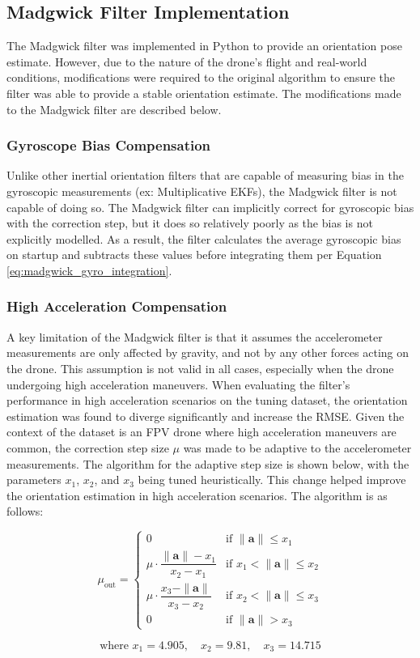 \documentclass[bare_jrnl_transmag]{subfiles}
\begin{document}
\subsection{Madgwick Filter Implementation}
The Madgwick filter was implemented in Python to provide an orientation pose estimate. However, due to the nature of the drone's flight and real-world conditions, modifications were required to the original algorithm to ensure the filter was able to provide a stable orientation estimate. The modifications made to the Madgwick filter are described below. \newline

\subsubsection{Gyroscope Bias Compensation}
Unlike other inertial orientation filters that are capable of measuring bias in the gyroscopic measurements (ex: Multiplicative EKFs), the Madgwick filter is not capable of doing so. The Madgwick filter can implicitly correct for gyroscopic bias with the correction step, but it does so relatively poorly as the bias is not explicitly modelled. As a result, the filter calculates the average gyroscopic bias on startup and subtracts these values before integrating them per Equation \ref{eq:madgwick_gyro_integration}. \newline

\subsubsection{High Acceleration Compensation}
A key limitation of the Madgwick filter is that it assumes the accelerometer measurements are only affected by gravity, and not by any other forces acting on the drone. This assumption is not valid in all cases, especially when the drone undergoing high acceleration maneuvers. When evaluating the filter's performance in high acceleration scenarios on the tuning dataset, the orientation estimation was found to diverge significantly and increase the RMSE. Given the context of the dataset is an FPV drone where high acceleration maneuvers are common, the correction step size $\mu$ was made to be adaptive to the accelerometer measurements. The algorithm for the adaptive step size is shown below, with the parameters $x_1$, $x_2$, and $x_3$ being tuned heuristically. This change helped improve the orientation estimation in high acceleration scenarios. The algorithm is as follows:

\[
\mu_{\text{out}} =
\begin{cases}
0 & \text{if } \|\mathbf{a}\| \leq x_1 \\
\mu \cdot \dfrac{\|\mathbf{a}\| - x_1}{x_2 - x_1} & \text{if } x_1 < \|\mathbf{a}\| \leq x_2 \\
\mu \cdot \dfrac{x_3 - \|\mathbf{a}\|}{x_3 - x_2} & \text{if } x_2 < \|\mathbf{a}\| \leq x_3 \\
0 & \text{if } \|\mathbf{a}\| > x_3
\end{cases}
\]

\[
\text{where } x_1 = 4.905, \quad x_2 = 9.81, \quad x_3 = 14.715
\]
\end{document}
